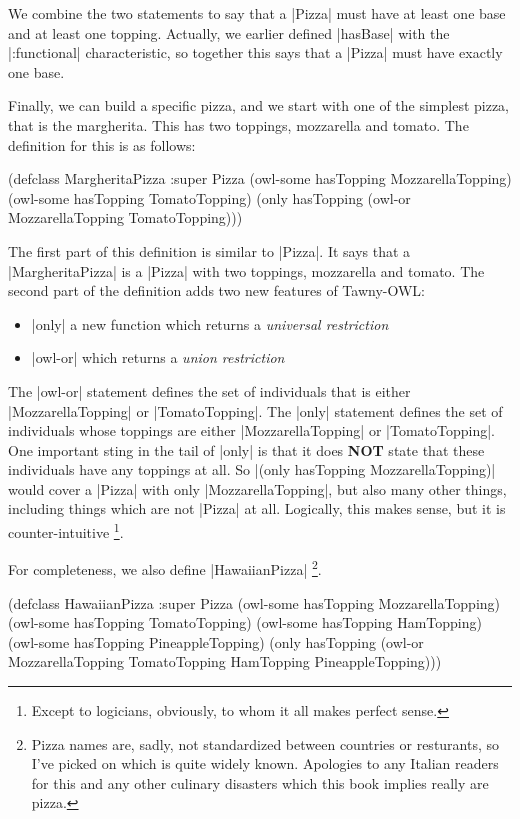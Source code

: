 We combine the two statements to say that a |Pizza| must have at least one
base and at least one topping. Actually, we earlier defined |hasBase| with the
|:functional| characteristic, so together this says that a |Pizza| must have
exactly one base.

Finally, we can build a specific pizza, and we start with one of the simplest
pizza, that is the margherita. This has two toppings, mozzarella and tomato.
The definition for this is as follows:

\begin{tawny}
(defclass MargheritaPizza
  :super
  Pizza
  (owl-some hasTopping MozzarellaTopping)
  (owl-some hasTopping TomatoTopping)
  (only hasTopping (owl-or MozzarellaTopping TomatoTopping)))
\end{tawny}

The first part of this definition is similar to |Pizza|. It says that a
|MargheritaPizza| is a |Pizza| with two toppings, mozzarella and tomato. The
second part of the definition adds two new features of Tawny-OWL:

\begin{itemize}
\item |only| a new function which returns a \emph{universal restriction}
\item |owl-or| which returns a \emph{union restriction}
\end{itemize}

The |owl-or| statement defines the set of individuals that is either
|MozzarellaTopping| or |TomatoTopping|. The |only| statement
defines the set of individuals whose toppings are either
|MozzarellaTopping| or |TomatoTopping|. One important sting in the
tail of |only| is that it does \textbf{NOT} state that these individuals
have any toppings at all. So |(only hasTopping MozzarellaTopping)| would
cover a |Pizza| with only |MozzarellaTopping|, but also many other
things, including things which are not |Pizza| at all. Logically, this
makes sense, but it is counter-intuitive \footnote{Except to logicians,
  obviously, to whom it all makes perfect sense.}.

For completeness, we also define |HawaiianPizza| \footnote{Pizza names are, sadly,
not standardized between countries or resturants, so I've picked on which is
quite widely known. Apologies to any Italian readers for this and any other
culinary disasters which this book implies really are pizza.}.

\begin{tawny}
(defclass HawaiianPizza
  :super
  Pizza
  (owl-some hasTopping MozzarellaTopping)
  (owl-some hasTopping TomatoTopping)
  (owl-some hasTopping HamTopping)
  (owl-some hasTopping PineappleTopping)
  (only hasTopping
        (owl-or MozzarellaTopping TomatoTopping HamTopping PineappleTopping)))
\end{tawny}

